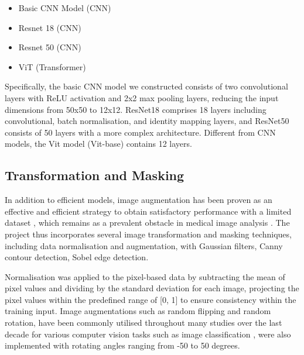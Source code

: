 \documentclass[letterpaper,9pt,twocolumn,twoside,]{pinp}
\providecommand{\tightlist}{%
  \setlength{\itemsep}{0pt}\setlength{\parskip}{0pt}}
\begin{document}
\begin{itemize}
\tightlist
\item
  Basic CNN Model (CNN)
\item
  Resnet 18 (CNN)
\item
  Resnet 50 (CNN)
\item
  ViT (Transformer)
\end{itemize}

Specifically, the basic CNN model we constructed consists of two
convolutional layers with ReLU activation and 2x2 max pooling layers,
reducing the input dimensions from 50x50 to 12x12. ResNet18 comprises 18
layers including convolutional, batch normalisation, and identity
mapping layers, and ResNet50 consists of 50 layers with a more complex
architecture. Different from CNN models, the Vit model (Vit-base)
contains 12 layers.

\hypertarget{transformation-and-masking}{%
\subsection{Transformation and
Masking}\label{transformation-and-masking}}

In addition to efficient models, image augmentation has been proven as
an effective and efficient strategy to obtain satisfactory performance
with a limited dataset \citep{xu2023comprehensive}, which remains as a
prevalent obstacle in medical image analysis \citep{shorten2019survey}.
The project thus incorporates several image transformation and masking
techniques, including data normalisation and augmentation, with Gaussian
filters, Canny contour detection, Sobel edge detection.

Normalisation was applied to the pixel-based data by subtracting the
mean of pixel values and dividing by the standard deviation for each
image, projecting the pixel values within the predefined range of {[}0,
1{]} to ensure consistency within the training input. Image
augmentations such as random flipping and random rotation, have been
commonly utilised throughout many studies over the last decade for
various computer vision tasks such as image classification
\citep{xu2023comprehensive}, were also implemented with rotating angles
ranging from -50 to 50 degrees.
\end{document}
